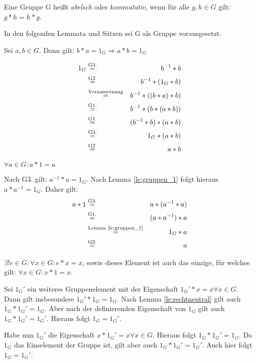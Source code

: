 \documentclass[10pt]{scrbook}
\begin{document}
\begin{Def}
Eine Gruppe G heißt \emph{abelsch} oder \emph{kommutativ}, wenn für alle $g, h\in G$ gilt: $g*h=h*g$.
\end{Def}

\begin{Def}
In den folgenden Lemmata und Sätzen sei G als Gruppe vorausgesetzt.
\end{Def}

\begin{Le}\label{le:gruppen_1} Sei $a, b\in G$. Dann gilt: $b*a=1_G\Rightarrow a*b=1_G$\end{Le}
\begin{bew}
\begin{eqnarray*}
	1_G & \stackrel{\textnormal{G3.}}{=} & b^{-1}*b \\
	& \stackrel{\textnormal{G2.}}{=} & b^{-1}*(1_G*b) \\
	& \stackrel{\textnormal{Voraussetzung}}{=} & b^{-1}*((b*a)*b) \\
	& \stackrel{\textnormal{G1.}}{=} & b^{-1}*(b*(a*b)) \\
	& \stackrel{\textnormal{G1.}}{=} & (b^{-1}*b)*(a*b) \\
	& \stackrel{\textnormal{G3.}}{=} & 1_G*(a*b) \\
	& \stackrel{\textnormal{G2.}}{=} & a*b
\end{eqnarray*}
\end{bew}

\begin{Le}\label{le:rechtneutral}$\forall a\in G: a*1=a$\end{Le}
\begin{bew}
Nach G3. gilt: $a^{-1}*a=1_G$. Nach Lemma \ref{le:gruppen_1} folgt hieraus $a*a^{-1}=1_G$. Daher gilt:
\begin{eqnarray*}
a*1 & \stackrel{\textnormal{G3.}}{=} & a*(a^{-1}*a) \\
 & \stackrel{\textnormal{G1.}}{=} & (a*a^{-1})*a \\
 & \stackrel{\textnormal{Lemma \ref{le:gruppen_1}}}{=} & 1_G*a \\
 & \stackrel{\textnormal{G2.}}{=} & a
\end{eqnarray*}
\end{bew}

\begin{Le}
$\exists ! e\in G: \forall x\in G: e*x=x$, sowie dieses Element ist auch das einzige, für welches gilt: $\forall x\in G: x*1=x$.
\end{Le}
\begin{bew}
Sei $1_G'$ ein weiteres Gruppenelement mit der Eigenschaft $1_G'*x=x\forall x\in G$. Dann gilt insbesondere $1_G'*1_G=1_G$. Nach Lemma \ref{le:rechtneutral} gilt auch $1_G*1_G'=1_G$. Aber nach der definierenden Eigenschaft von $1_G$ gilt auch $1_G*1_G'=1_G'$. Hieraus folgt $1_G=1_G'$.

Habe nun $1_G'$ die Eigenschaft $x*1_G'=x\forall x\in G$. Hieraus folgt $1_G*1_G'=1_G$. Da $1_G$ das Einselement der Gruppe ist, gilt aber auch $1_G*1_G'=1_G'$. Auch hier folgt $1_G=1_G'$.
\end{bew}
\end{document}
